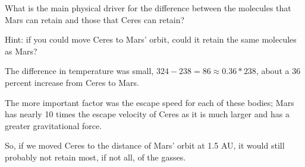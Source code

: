 \documentclass[../astro_4]{subfiles}
\begin{document}
\begin{problem}
What is the main physical driver for the difference between the molecules that Mars can retain and those that Ceres can retain?

Hint: if you could move Ceres to Mars' orbit, could it retain the same molecules as Mars?
\end{problem}

The difference in temperature was small, $324 - 238 = 86 \approx 0.36 * 238$, about a 36 percent increase from Ceres to Mars.

The more important factor was the escape speed for each of these bodies; Mars has nearly 10 times the escape velocity of Ceres as it is much larger and has a greater gravitational force.

So, if we moved Ceres to the distance of Mars' orbit at 1.5 AU, it would still probably not retain most, if not all, of the gasses.
\end{document}
